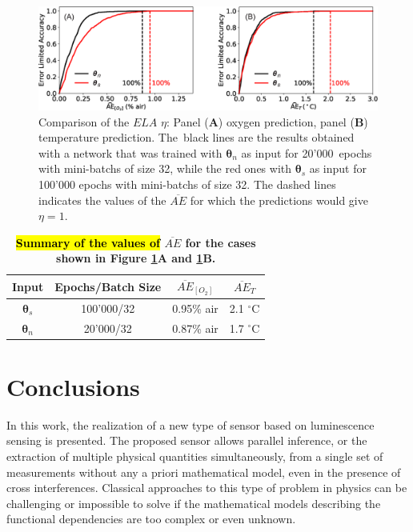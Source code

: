 \documentclass[sensors,article,accept,moreauthors,pdftex,10pt,a4paper]{Definitions/mdpi}
\begin{document}
\begin{figure}[H]
\centering
\includegraphics[width=14 cm]{ELA_comparison_O2_T.eps}
\caption{Comparison of the $ELA$ $\eta$: Panel (\textbf{A}) oxygen prediction, panel (\textbf{B}) temperature prediction. The~black lines are the results obtained with a network that was trained with ${\pmb \theta}_n$ as input for 20'000~epochs with mini-batchs of size 32, while the red ones with ${\pmb \theta}_s$ as input for 100'000 epochs with mini-batchs of size 32. The dashed lines indicates the values of the $\overline{AE}$ for which the predictions would give $\eta=1$.}
\label{fig:ELA_result_comparison}
\end{figure}

\begin{table}[H]
\centering
\caption {\bf \hl{Summary of the values of} $\overline{AE}$ for the cases shown in Figure \ref{fig:ELA_result_comparison}A and \ref{fig:ELA_result_comparison}B.}
\label{table:ela}
\begin{tabular}{ cccc}
\toprule
 \textbf{Input} & \textbf{Epochs/Batch Size} & \boldmath$\overline{AE}_{[O_2]}$ & \boldmath$\overline{AE}_{T}$  \\ 
\midrule
${\pmb \theta}_s$ & 100'000/32 & 0.95\% air & 2.1 $^\circ$C\\ 
${\pmb \theta}_n $ & 20'000/32 & 0.87\% air & 1.7 $^\circ$C\\ 
\bottomrule
\end{tabular}

\end{table}


\section{Conclusions}

In this work, the realization of a new type of sensor based on luminescence sensing is presented. The proposed sensor allows parallel inference, or the extraction of multiple physical quantities simultaneously, from a single set of measurements without any {a priori} mathematical model, even in the presence of cross interferences. Classical approaches to this type of problem in physics can be challenging or impossible to solve if the mathematical models describing the functional dependencies are too complex or even unknown.
\end{document}
